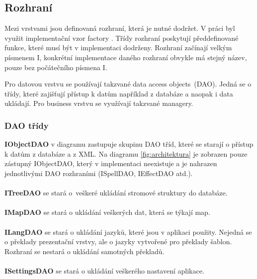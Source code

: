 \documentclass[thesis=B,czech]{resources/FITthesis}[2012/06/26]
\begin{document}
\subsection{Rozhraní}
Mezi vrstvami jsou definovaná rozhraní, která je nutné dodržet. V práci byl využit implementační vzor factory \cite{factory}. Třídy rozhraní poskytují předdefinované funkce, které musí být v implementaci dodrženy. Rozhraní začínají velkým písmenem I, konkrétní implementace daného rozhraní obvykle má stejný název, pouze bez počátečního písmena I.\par

Pro datovou vrstvu se používají takzvané \clqq data access objects\crqq  ~(DAO). Jedná se o třídy, které zajišťují přístup k datům například z databáze a naopak i data ukládají. Pro business vrstvu se využívají takzvané \clqq managery\crqq .\par


\subsubsection*{DAO třídy}
\noindent\textbf{IObjectDAO} v diagramu zastupuje skupinu DAO tříd, které se starají o přístup k datům z databáze a z XML. Na diagramu \ref{fig:architektura} je zobrazen pouze zástupný IObjectDAO, který v implementaci neexistuje a je nahrazen jednotlivými DAO rozhraními (ISpellDAO, IEffectDAO atd.).\\
\\
\textbf{ITreeDAO} se stará o~veškeré ukládání stromové struktury do databáze. \\
\\
\textbf{IMapDAO} se stará o ukládání veškerých dat, která se týkají map. \\
\\
\textbf{ILangDAO} se stará o ukládání jazyků, které jsou v aplikaci použity. Nejedná se o překlady prezentační vrstvy, ale o jazyky vytvořené pro překlady šablon. Rozhraní se nestará o ukládání samotných překladů.\\
\\
\textbf{ISettingsDAO} se stará o ukládání veškerého nastavení aplikace. 
\end{document}
